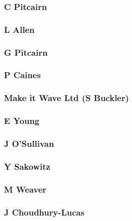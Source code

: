 \documentclass[letterpaper,10pt,english]{sphinxmanual}
\begin{document}
\subsubsection{C Pitcairn}
\label{\detokenize{investors:c-pitcairn}}

\subsubsection{L Allen}
\label{\detokenize{investors:l-allen}}

\subsubsection{G Pitcairn}
\label{\detokenize{investors:g-pitcairn}}

\subsubsection{P Caines}
\label{\detokenize{investors:p-caines}}

\subsubsection{Make it Wave Ltd (S Buckler)}
\label{\detokenize{investors:make-it-wave-ltd-s-buckler}}

\subsubsection{E Young}
\label{\detokenize{investors:e-young}}

\subsubsection{J O’Sullivan}
\label{\detokenize{investors:j-osullivan}}

\subsubsection{Y Sakowitz}
\label{\detokenize{investors:y-sakowitz}}

\subsubsection{M Weaver}
\label{\detokenize{investors:m-weaver}}

\subsubsection{J Choudhury-Lucas}
\label{\detokenize{investors:j-choudhury-lucas}}
\end{document}
